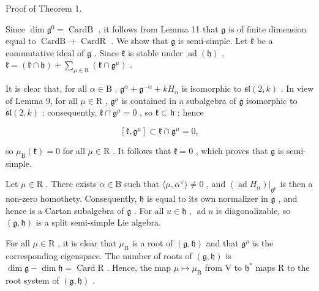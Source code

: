 Proof of Theorem 1.

Since \(\dim \mathfrak{g}^0 = \operatorname{CardB}\) , it follows from Lemma 11 that \(\mathfrak{g}\) is of finite dimension equal to \(\operatorname{CardB} + \operatorname{CardR}\) . We show that \(\mathfrak{g}\) is semi-simple. Let \(\mathfrak{k}\) be a commutative ideal of \(\mathfrak{g}\) . Since \(\mathfrak{k}\) is stable under \(\operatorname{ad}(\mathfrak{h})\) , \(\mathfrak{k} = (\mathfrak{k} \cap \mathfrak{h}) + \sum_{\mu \in \mathrm{R}} (\mathfrak{k} \cap \mathfrak{g}^\mu)\) .

It is clear that, for all \(\alpha \in \mathrm{B}\) , \(\mathfrak{g}^{\alpha} + \mathfrak{g}^{-\alpha} + kH_{\alpha}\) is isomorphic to \(\mathfrak{sl}(2,k)\) . In view of Lemma 9, for all \(\mu \in \mathrm{R}\) , \(\mathfrak{g}^{\mu}\) is contained in a subalgebra of \(\mathfrak{g}\) isomorphic to \(\mathfrak{sl}(2,k)\) ; consequently, \(\mathfrak{k} \cap \mathfrak{g}^{\mu} = 0\) , so \(\mathfrak{k} \subset \mathfrak{h}\) ; hence

\[
[ \mathfrak {k}, \mathfrak {g} ^ {\mu} ] \subset \mathfrak {k} \cap \mathfrak {g} ^ {\mu} = 0,
\]

so \(\mu_{\mathrm{B}}(\mathfrak{k}) = 0\) for all \(\mu \in \mathrm{R}\) . It follows that \(\mathfrak{k} = 0\) , which proves that \(\mathfrak{g}\) is semi-simple.

Let \(\mu \in \mathrm{R}\) . There exists \(\alpha \in \mathrm{B}\) such that \(\langle \mu, \alpha^{\vee} \rangle \neq 0\) , and \((\operatorname{ad} H_{\alpha})|_{\mathfrak{g}^{\mu}}\) is then a non-zero homothety. Consequently, \(\mathfrak{h}\) is equal to its own normalizer in \(\mathfrak{g}\) , and hence is a Cartan subalgebra of \(\mathfrak{g}\) . For all \(u \in \mathfrak{h}\) , \(\operatorname{ad} u\) is diagonalizable, so \((\mathfrak{g}, \mathfrak{h})\) is a split semi-simple Lie algebra.

For all \(\mu \in \mathrm{R}\) , it is clear that \(\mu_{\mathrm{B}}\) is a root of \((\mathfrak{g},\mathfrak{h})\) and that \(\mathfrak{g}^{\mu}\) is the corresponding eigenspace. The number of roots of \((\mathfrak{g},\mathfrak{h})\) is \(\dim \mathfrak{g} - \dim \mathfrak{h} = \operatorname{Card}\mathrm{R}\) . Hence, the map \(\mu \mapsto \mu_{\mathrm{B}}\) from V to \(\mathfrak{h}^*\) maps R to the root system of \((\mathfrak{g},\mathfrak{h})\) .

